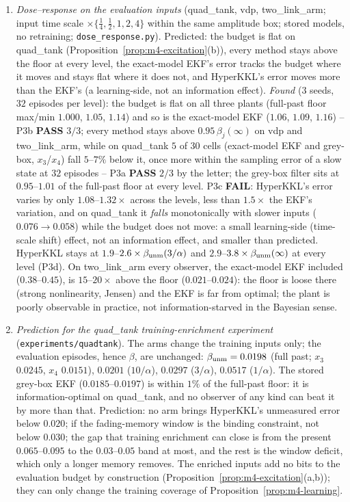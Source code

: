 \begin{enumerate}
\item[(P3)] \emph{Dose--response on the evaluation inputs} (quad\_tank, vdp, two\_link\_arm; input time scale
$\times\{\tfrac14,\tfrac12,1,2,4\}$ within the same amplitude box; stored models, no retraining;
\texttt{dose\_response.py}). Predicted: the budget is flat on quad\_tank (Proposition~\ref{prop:m4-excitation}(b)),
every method stays above the floor at every level, the exact-model EKF's error tracks the budget where it moves
and stays flat where it does not, and HyperKKL's error moves more than the EKF's (a learning-side, not an
information effect). \emph{Found} ($3$ seeds, $32$ episodes per level): the budget is flat on all three plants
(full-past floor max/min $1.000$, $1.05$, $1.14$) and so is the exact-model EKF ($1.06$, $1.09$, $1.16$) -- P3b
\textbf{PASS} $3/3$; every method stays above $0.95\,\beta_j(\infty)$ on vdp and two\_link\_arm, while on quad\_tank
$5$ of $30$ cells (exact-model EKF and grey-box, $x_3$/$x_4$) fall $5$--$7\%$ below it, once more within the sampling
error of a slow state at $32$ episodes -- P3a \textbf{PASS} $2/3$ by the letter; the grey-box filter sits at
$0.95$--$1.01$ of the full-past floor at every level. P3c \textbf{FAIL}: HyperKKL's error varies by only
$1.08$--$1.32\times$ across the levels, less than $1.5\times$ the EKF's variation, and on quad\_tank it \emph{falls}
monotonically with slower inputs ($0.076\to0.058$) while the budget does not move: a small learning-side
(time-scale shift) effect, not an information effect, and smaller than predicted. HyperKKL stays at
$1.9$--$2.6\times\beta_{\rm unm}(3/\alpha)$ and $2.9$--$3.8\times\beta_{\rm unm}(\infty)$ at every level (P3d).
On two\_link\_arm every observer, the exact-model EKF included ($0.38$--$0.45$), is $15$--$20\times$ above the floor
($0.021$--$0.024$): the floor is loose there (strong nonlinearity, Jensen) and the EKF is far from optimal; the
plant is poorly observable in practice, not information-starved in the Bayesian sense.
\item[(P4)] \emph{Prediction for the quad\_tank training-enrichment experiment} (\texttt{experiments/quadtank}).
The arms change the training inputs only; the evaluation episodes, hence $\beta$, are unchanged:
$\beta_{\rm unm}=0.0198$ (full past; $x_3$ $0.0245$, $x_4$ $0.0151$), $0.0201$ ($10/\alpha$), $0.0297$ ($3/\alpha$),
$0.0517$ ($1/\alpha$). The stored grey-box EKF ($0.0185$--$0.0197$) is within $1\%$ of the full-past floor: it is
information-optimal on quad\_tank, and no observer of any kind can beat it by more than that. Prediction: no arm
brings HyperKKL's unmeasured error below $0.020$; if the fading-memory window is the binding constraint, not
below $0.030$; the gap that training enrichment can close is from the present $0.065$--$0.095$ to the
$0.03$--$0.05$ band at most, and the rest is the window deficit, which only a longer memory removes. The enriched
inputs add no bits to the evaluation budget by construction (Proposition~\ref{prop:m4-excitation}(a,b));
they can only change the training coverage of Proposition~\ref{prop:m4-learning}.
\end{enumerate}
